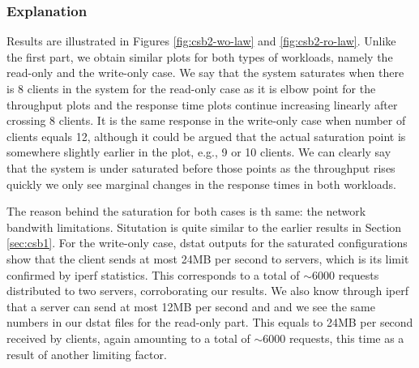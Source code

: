 \documentclass[11pt,a4paper]{article}
\begin{document}
\subsubsection{Explanation} \label{sec:csb2-exp}
Results are illustrated in Figures \ref{fig:csb2-wo-law} and \ref{fig:csb2-ro-law}. Unlike the first part, we obtain similar plots for both types of workloads, namely the read-only and the write-only case. We say that the system saturates when there is 8 clients in the system for the read-only case as it is elbow point for the throughput plots and the response time plots continue increasing linearly after crossing 8 clients. It is the same response in the write-only case when number of clients equals 12, although it could be argued that the actual saturation point is somewhere slightly earlier in the plot, e.g., 9 or 10 clients. We can clearly say that the system is under saturated before those points as the throughput rises quickly we only see marginal changes in the response times in both workloads. 
\par The reason behind the saturation for both cases is th same: the network bandwith limitations. Situtation is quite similar to the earlier results in Section \ref{sec:csb1}. For the write-only case, dstat outputs for the saturated configurations show that the client sends at most 24MB per second to servers, which is its limit confirmed by iperf statistics. This corresponds to a total of $\sim 6000$ requests distributed to two servers, corroborating our results. We also know through iperf that a server can send at most 12MB per second and and we see the same numbers in our dstat files for the read-only part. This equals to 24MB per second received by clients, again amounting to a total of $\sim 6000$ requests, this time as a result of another limiting factor.
\end{document}
